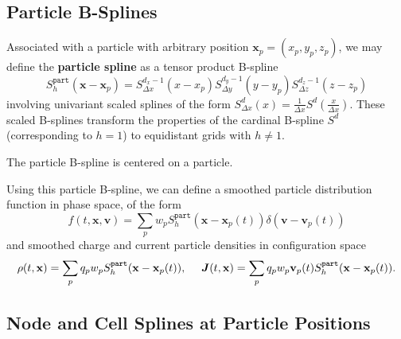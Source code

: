 \documentclass[11pt]{article}
\renewcommand{\part}{\texttt{part}}
\begin{document}
\subsection{Particle B-Splines}
\label{sec:part_splines}

Associated with a particle with arbitrary position 
$\mathbf{x}_p = (x_p,y_p, z_p)$, we may define the \textbf{particle spline} as a tensor product B-spline
\begin{equation} 
    \label{eq:S_part}
    S^\part_h( \mathbf{x}-\mathbf{x}_p) = S_{\Delta x}^{d_x-1}(x-x_p)S_{\Delta y}^{d_y-1}(y-y_p)S_{\Delta z}^{d_z-1}(z-z_p)
\end{equation}
involving univariant scaled splines of the form $S_{\Delta x}^d(x)=\frac {1}{\Delta x} S^d(\frac{x}{\Delta x})$.
These scaled B-splines transform the properties of the cardinal B-spline $S^d$ (corresponding to $h=1$) to equidistant grids with $h\neq1$. 

The particle B-spline is centered on a particle.

Using this particle B-spline, we can define a smoothed particle distribution function in phase space, of the form
\begin{equation}
    \label{eq:f_part}
    f(t,\mathbf{x},\mathbf{v}) = \sum_p w_p S^\part_h(\mathbf{x}-\mathbf{x}_p(t))\delta (\mathbf{v}-\mathbf{v}_p(t))
\end{equation}
and smoothed charge and current particle densities in configuration space
\begin{equation}
    \label{eq:rho_J_part}
    \rho(t,\mathbf{x}) = \sum_p q_p w_p S^\part_h(\mathbf{x}-\mathbf{x}_p(t)), 
    ~~~~ 
    \bJ(t,\mathbf{x}) = \sum_p q_p w_p \mathbf{v}_p(t) S^\part_h(\mathbf{x}-\mathbf{x}_p(t)).
\end{equation}


\subsection{Node and Cell Splines at Particle Positions}
\label{sec:node_cell_splines}
\end{document}
